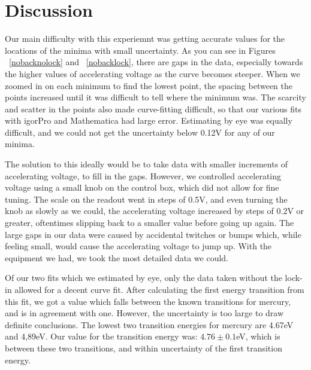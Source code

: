 \documentclass[prb,preprint]{revtex4-1}
\begin{document}
\section{Discussion}
Our main difficulty with this experiemnt was getting accurate values for the locations of the minima with small uncertainty.  As you can see in Figures ~\ref{nobacknolock} and ~\ref{nobacklock}, there are gaps in the data, especially towards the higher values of accelerating voltage as the curve becomes steeper.  When we zoomed in on each minimum to find the lowest point, the spacing between the points increased until it was difficult to tell where the minimum was.  The scarcity and scatter in the points also made curve-fitting difficult, so that our various fits with igorPro and Mathematica had large error. Estimating by eye was equally difficult, and we could not get the uncertainty below 0.12V for any of our minima.  

The solution to this ideally would be to take data with smaller increments of accelerating voltage, to fill in the gaps. However, we controlled accelerating voltage using a small knob on the control box, which did not allow for fine tuning. The scale on the readout went in steps of 0.5V, and even turning the knob as slowly as we could, the accelerating voltage increased by steps of 0.2V or greater, oftentimes slipping back to a smaller value before going up again. The large gaps in our data were caused by accidental twitches or bumps which, while feeling small, would cause the accelerating voltage to jump up. With the equipment we had,  we took the most detailed data we could. 

Of our two fits which we estimated by eye, only the data taken without the lock-in allowed for a decent curve fit.  After calculating the first energy transition from this fit, we got a value which falls between the known transitions for mercury, and is in agreement with one.  However, the uncertainty is too large to draw definite conclusions.  The lowest two transition energies for mercury are 4.67eV and 4,89eV.  Our value for the transition energy was: $4.76 \pm 0.1$eV, which is between these two transitions, and within uncertainty of the first transition energy. 
\end{document}

